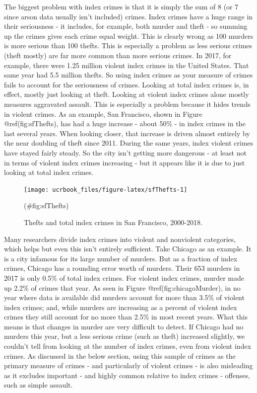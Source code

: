 \documentclass[
  12pt,
  openany]{book}
\begin{document}
The biggest problem with index crimes is that it is simply the sum of 8 (or 7 since arson data usually isn't included) crimes. Index crimes have a huge range in their seriousness - it includes, for example, both murder and theft - so summing up the crimes gives each crime equal weight. This is clearly wrong as 100 murders is more serious than 100 thefts. This is especially a problem as less serious crimes (theft mostly) are far more common than more serious crimes. In 2017, for example, there were 1.25 million violent index crimes in the United States. That same year had 5.5 million thefts. So using index crimes as your measure of crimes fails to account for the seriousness of crimes. Looking at total index crimes is, in effect, mostly just looking at theft. Looking at violent index crimes alone mostly measures aggravated assault. This is especially a problem because it hides trends in violent crimes. As an example, San Francisco, shown in Figure @ref(fig:sfThefts), has had a huge increase - about 50\% - in index crimes in the last several years. When looking closer, that increase is driven almost entirely by the near doubling of theft since 2011. During the same years, index violent crimes have stayed fairly steady. So the city isn't getting more dangerous - at least not in terms of violent index crimes increasing - but it appears like it is due to just looking at total index crimes.

\begin{figure}

{\centering \texttt{[image: ucrbook\_files/figure-latex/sfThefts-1]} 

}

\caption{Thefts and total index crimes in San Francisco, 2000-2018.}(\#fig:sfThefts)
\end{figure}

Many researchers divide index crimes into violent and nonviolent categories, which helps but even this isn't entirely sufficient. Take Chicago as an example. It is a city infamous for its large number of murders. But as a fraction of index crimes, Chicago has a rounding error worth of murders. Their 653 murders in 2017 is only 0.5\% of total index crimes. For violent index crimes, murder made up 2.2\% of crimes that year. As seen in Figure @ref(fig:chicagoMurder), in no year where data is available did murders account for more than 3.5\% of violent index crimes; and, while murders are increasing as a percent of violent index crimes they still account for no more than 2.5\% in most recent years. What this means is that changes in murder are very difficult to detect. If Chicago had no murders this year, but a less serious crime (such as theft) increased slightly, we couldn't tell from looking at the number of index crimes, even from violent index crimes. As discussed in the below section, using this sample of crimes as the primary measure of crimes - and particularly of violent crimes - is also misleading as it excludes important - and highly common relative to index crimes - offenses, such as simple assault.
\end{document}

